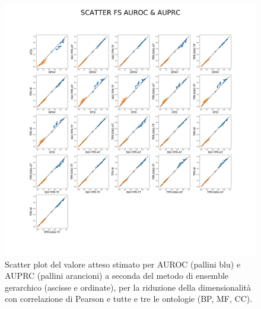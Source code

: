 \documentclass[12pt]{report}
\begin{document}
\begin{figure}
 \hspace*{-2.6cm}
\includegraphics[scale=0.3]{./images/scatterplot_FS.png}
\caption{\footnotesize{Scatter plot del valore atteso stimato per AUROC (pallini blu) e AUPRC (pallini arancioni) a seconda del metodo di ensemble gerarchico (ascisse e ordinate), per la riduzione della dimensionalità con correlazione di Pearson e tutte e tre le ontologie (BP, MF, CC).}}
\label{scatter_1}
\end{figure}
\end{document}
